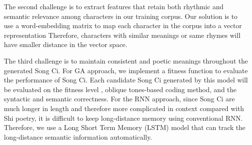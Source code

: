 The second challenge is to extract features that retain both rhythmic and semantic relevance among characters in our training corpus. 
%
Our solution is to use a word-embedding matrix to map each character in the corpus into a vector representation
% 
Therefore, characters with similar meanings or same rhymes will have smaller distance in the vector space.


The third challenge is to maintain consistent and poetic meanings throughout the generated Song Ci.
%
{
For GA approach, we implement a fitness function to evaluate the performance of Song Ci. Each candidate Song Ci generated by this model will be evaluated on the fitness level , oblique tones-based coding method, and the syntactic and semantic correctness.}
%
For the RNN approach, since Song Ci are much longer in length and therefore more complicated in context compared with Shi poetry, it is difficult to keep long-distance memory using conventional RNN.
%
Therefore, we use a Long Short Term Memory (LSTM) model that can track the long-distance semantic information automatically.
% 
